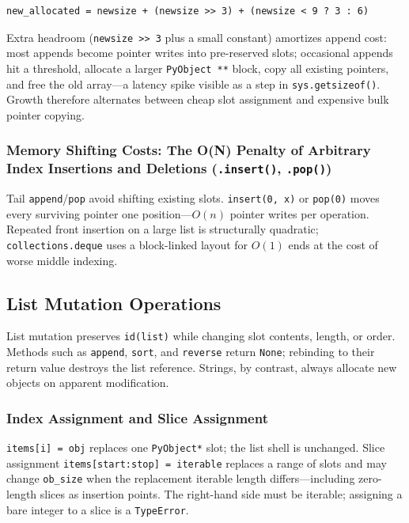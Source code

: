\documentclass[a4paper,twoside]{report}
\begin{document}
\begin{verbatim}
new_allocated = newsize + (newsize >> 3) + (newsize < 9 ? 3 : 6)
\end{verbatim}

Extra headroom (\texttt{newsize >> 3} plus a small constant) amortizes append cost: most appends become pointer writes into pre-reserved slots; occasional appends hit a threshold, allocate a larger \texttt{PyObject **} block, copy all existing pointers, and free the old array---a latency spike visible as a step in \texttt{sys.getsizeof()}. Growth therefore alternates between cheap slot assignment and expensive bulk pointer copying.

\subsubsection{Memory Shifting Costs: The O(N) Penalty of Arbitrary Index Insertions and Deletions (\texttt{.insert()}, \texttt{.pop()})}

Tail \texttt{append}/\texttt{pop} avoid shifting existing slots. \texttt{insert(0, x)} or \texttt{pop(0)} moves every surviving pointer one position---$O(n)$ pointer writes per operation. Repeated front insertion on a large list is structurally quadratic; \texttt{collections.deque} uses a block-linked layout for $O(1)$ ends at the cost of worse middle indexing.


\subsection{List Mutation Operations}

List mutation preserves \texttt{id(list)} while changing slot contents, length, or order. Methods such as \texttt{append}, \texttt{sort}, and \texttt{reverse} return \texttt{None}; rebinding to their return value destroys the list reference. Strings, by contrast, always allocate new objects on apparent modification.

\subsubsection{Index Assignment and Slice Assignment}

\texttt{items[i] = obj} replaces one \texttt{PyObject*} slot; the list shell is unchanged. Slice assignment \texttt{items[start:stop] = iterable} replaces a range of slots and may change \texttt{ob\_size} when the replacement iterable length differs---including zero-length slices as insertion points. The right-hand side must be iterable; assigning a bare integer to a slice is a \texttt{TypeError}.
\end{document}
